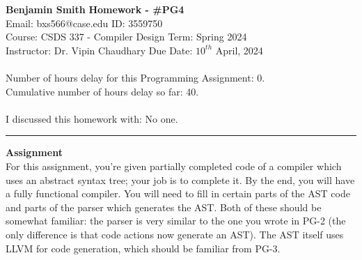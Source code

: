 \documentclass[a4paper, 11pt]{article}
\begin{document}
\noindent
\large\textbf{Benjamin Smith} \hfill \textbf{Homework - \#PG4}   \\
Email: bxs566@case.edu \hfill ID: 3559750 \\
\normalsize Course: CSDS 337 - Compiler Design \hfill Term: Spring 2024\\
Instructor: Dr. Vipin Chaudhary \hfill Due Date: $10^{th}$ April, 2024 \\ \\
Number of hours delay for this Programming Assignment: \hfill 0.\\
Cumulative number of hours delay so far: \hfill 40. \\ \\
I discussed this homework with: \hfill No one. \\
\noindent\rule{7in}{2.8pt}



\large\textbf{Assignment} \\
For this assignment, you're given partially completed code of a compiler which uses an abstract syntax tree; your job is to complete it. By the end, you will have a fully functional compiler. You will need to fill in certain parts of the AST code and parts of the parser which generates the AST. Both of these should be somewhat familiar: the parser is very similar to the one you wrote in PG-2 (the only difference is that code actions now generate an AST). The AST itself uses LLVM for code generation, which should be familiar from PG-3.
\end{document}
